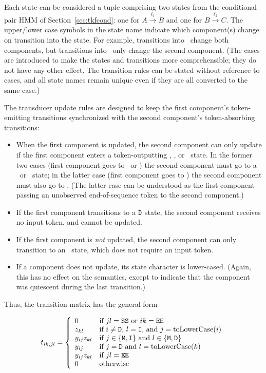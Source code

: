 \documentclass{article}
\newcommand\secref[1]{Section~\ref{sec:#1}}
\begin{document}
Each state can be considered a tuple comprising two states from the conditional pair HMM
of \secref{tkfcond}:
one for
$A \xrightarrow{\ell_1} B$
and one for
$B \xrightarrow{\ell_2} C$.
The upper/lower case symbols in the state name indicate which component(s) change
on transition into the state.
For example, transitions into \matdel\ change both components,
but transitions into \insins\ only change the second component.
(The cases are introduced to make the states and transitions more comprehensible;
they do not have any other effect. The transition rules can be stated
without reference to cases, and all state names remain
unique even if they are all converted to the same case.)

The transducer update rules are designed to keep the first component's token-emitting transitions
synchronized with the second component's token-absorbing transitions:
\begin{itemize}
\item When the first component is updated, the second component can only update
if the first component enters a token-outputting \mat, \ins, or \fin\ state.
In the former two cases (first component goes to \mat\ or \ins) the second component must
go to a \mat\ or \del\ state; in the latter case (first component goes to \fin)
the second component must also go to \fin.
(The latter case can be understood as the first component passing an unobserved end-of-sequence token to the second component.)
\item If the first component transitions to a ${\tt D}$ state, the second component receives no input token, and cannot be updated.
\item If the first component is {\em not} updated, the second component can only transition to an \ins\ state, which does not require an input token.
\item If a component does not update, its state character is lower-cased.
(Again, this has no effect on the semantics, except to indicate that the component was quiescent during the last transition.)
\end{itemize}

Thus, the transition matrix has the general form

\[
t_{ik,jl} = \left\{ \begin{array}{ll}
0 & \mbox{if $jl={\tt SS}$ or $ik={\tt EE}$} \\
z_{kl} & \mbox{if $i \neq {\tt D}$, $l={\tt I}$, and $j=\mbox{toLowerCase}(i)$} \\
y_{ij}z_{kl} & \mbox{if $j \in \{ {\tt M},{\tt I} \}$ and $l \in \{ {\tt M},{\tt D} \}$} \\
y_{ij} & \mbox{if $j = {\tt D}$ and $l = \mbox{toLowerCase}(k)$} \\
y_{ij}z_{kl} & \mbox{if $jl={\tt EE}$} \\
0 & \mbox{otherwise}
\end{array} \right.
\]
\end{document}
